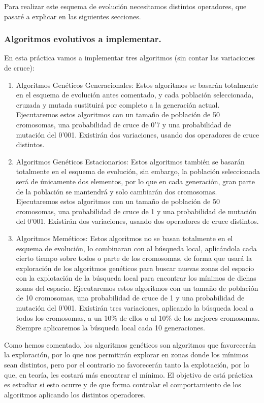 \documentclass[12pt, spanish]{article}
\begin{document}
Para realizar este esquema de evolución necesitamos distintos operadores, que pasaré a explicar en las siguientes secciones.

\subsubsection{Algoritmos evolutivos a implementar.}

En esta práctica vamos a implementar tres algoritmos (sin contar las variaciones de cruce):

\begin{enumerate}
	\item Algoritmos Genéticos Generacionales: Estos algoritmos se basarán totalmente en el esquema de evolución antes comentado, y cada población seleccionada, cruzada y mutada sustituirá por completo a la generación actual. Ejecutaremos estos algoritmos con un tamaño de población de 50 cromosomas, una probabilidad de cruce de 0'7 y una probabilidad de mutación del 0'001. Existirán dos variaciones, usando dos operadores de cruce distintos.
	\item Algoritmos Genéticos Estacionarios: Estos algoritmos también se basarán totalmente en el esquema de evolución, sin embargo, la población seleccionada será de únicamente dos elementos, por lo que en cada generación, gran parte de la población se mantendrá y solo cambiarán dos cromosomas. Ejecutaremos estos algoritmos con un tamaño de población de 50 cromosomas, una probabilidad de cruce de 1 y una probabilidad de mutación del 0'001. Existirán dos variaciones, usando dos operadores de cruce distintos.
	\item Algoritmos Meméticos: Estos algoritmos no se basan totalmente en el esquema de evolución, lo combinaran con al búsqueda local, aplicándola cada cierto tiempo sobre todos o parte de los cromosomas, de forma que usará la exploración de los algoritmos genéticos para buscar nuevas zonas del espacio con la explotación de la búsqueda local para encontrar los mínimos de dichas zonas del espacio.  Ejecutaremos estos algoritmos con un tamaño de población de 10 cromosomas, una probabilidad de cruce de 1 y una probabilidad de mutación del 0'001. Existirán tres variaciones, aplicando la búsqueda local a todos los cromosomas, a un 10\% de ellos o al 10\% de los mejores cromosomas. Siempre aplicaremos la búsqueda local cada 10 generaciones.
\end{enumerate}

Como hemos comentado, los algoritmos genéticos son algoritmos que favorecerán la exploración, por lo que nos permitirán explorar en zonas donde los mínimos sean distintos, pero por el contrario no favorecerán tanto la explotación, por lo que, en teoría, les costará más encontrar el mínimo. El objetivo de está práctica es estudiar si esto ocurre y de que forma controlar el comportamiento de los algoritmos aplicando los distintos operadores.
\end{document}

